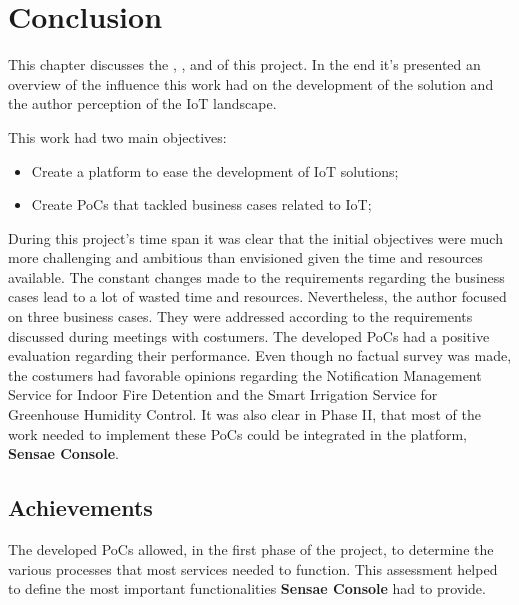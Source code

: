 \chapter{Conclusion}
\label{chap:conclusion}

This chapter discusses the , , and  of this project.
In the end it's presented an overview of the influence this work had on the development of the solution and the author perception of the \gls{IoT} landscape.

This work had two main objectives:

\begin{itemize}
    \item Create a platform to ease the development of \gls{IoT} solutions;
    \item Create \gls{PoC}s that tackled business cases related to \gls{IoT};
\end{itemize}

During this project's time span it was clear that the initial objectives were much more challenging and ambitious than envisioned given the time and resources available. The constant changes made to the requirements regarding the business cases lead to a lot of wasted time and resources. Nevertheless, the author focused on three business cases. They were addressed according to the requirements discussed during meetings with costumers. The developed \gls{PoC}s had a positive evaluation regarding their performance. Even though no factual survey was made, the costumers had favorable opinions regarding the Notification Management Service for Indoor Fire Detention and the Smart Irrigation Service for Greenhouse Humidity Control. It was also clear in Phase II, that most of the work needed to implement these \gls{PoC}s could be integrated in the platform, \textbf{Sensae Console}.

\section{Achievements}
\label{sec:conclusion:achivements}

The developed \gls{PoC}s allowed, in the first phase of the project, to determine the various processes that most services needed to function. This assessment helped to define the most important functionalities \textbf{Sensae Console} had to provide.

